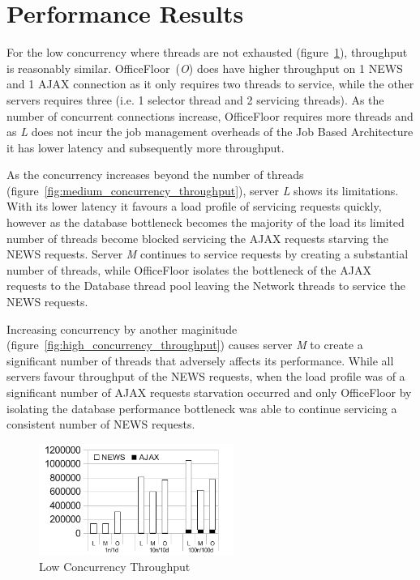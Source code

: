 \documentclass[conference]{ieee/IEEEtran}
\begin{document}
\section{Performance Results}
For the low concurrency where threads are not exhausted
(figure~\ref{fig:low_concurrency_throughput}), throughput is reasonably similar.
OfficeFloor~(\textit{O}) does have higher throughput on 1 NEWS and 1 AJAX
connection as it only requires two threads to service, while the other servers
requires three (i.e. 1 selector thread and 2 servicing threads).  As the number
of concurrent connections increase, OfficeFloor requires more threads and as
\textit{L} does not incur the job management overheads of the Job Based
Architecture it has lower latency and subsequently more throughput.

As the concurrency increases beyond the number of threads
(figure~\ref{fig:medium_concurrency_throughput}), server \textit{L} shows its
limitations.  With its lower latency it favours a load profile of servicing
requests quickly, however as the database bottleneck becomes the majority of the
load its limited number of threads become blocked servicing the AJAX requests
starving the NEWS requests.  Server \textit{M} continues to service requests by
creating a substantial number of threads, while OfficeFloor isolates the
bottleneck of the AJAX requests to the Database thread pool leaving the Network
threads to service the NEWS requests.

Increasing concurrency by another maginitude
(figure~\ref{fig:high_concurrency_throughput}) causes server \textit{M} to
create a significant number of threads that adversely affects its performance. 
While all servers favour throughput of the NEWS requests, when the load profile
was of a significant number of AJAX requests starvation occurred and only
OfficeFloor by isolating the database performance bottleneck was able to
continue servicing a consistent number of NEWS requests.

\begin{figure}[!t]
\centering 
\includegraphics[width=2.5in]{LowConcurrencyThroughput}
\caption{Low Concurrency Throughput}
\label{fig:low_concurrency_throughput}
\end{figure}
\end{document}
